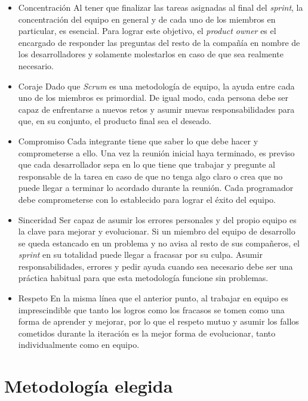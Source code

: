 \begin{itemize}

\item{Concentración} Al tener que finalizar las tareas asignadas al final del \textit{sprint}, la concentración del equipo en general y de cada uno de los miembros en particular, es esencial. Para lograr este objetivo, el \textit{product owner} es el encargado de responder las preguntas del resto de la compañía en nombre de los desarrolladores y solamente molestarlos en caso de que sea realmente necesario.

\item{Coraje} Dado que \textit{Scrum} es una metodología de equipo, la ayuda entre cada uno de los miembros es primordial. De igual modo, cada persona debe ser capaz de enfrentarse a nuevos retos y asumir nuevas responsabilidades para que, en su conjunto, el producto final sea el deseado. 

\item{Compromiso} Cada integrante tiene que saber lo que debe hacer y comprometerse a ello. Una vez la reunión inicial haya terminado, es previso que cada desarrollador sepa en lo que tiene que trabajar y pregunte al responsable de la tarea en caso de que no tenga algo claro o crea que no puede llegar a terminar lo acordado durante la reunión. Cada programador debe comprometerse con lo establecido para lograr el éxito del equipo.

\item{Sinceridad} Ser capaz de asumir los errores personales y del propio equipo es la clave para mejorar y evolucionar. Si un miembro del equipo de desarrollo se queda estancado en un problema y no avisa al resto de sus compañeros, el \textit{sprint} en su totalidad puede llegar a fracasar por su culpa. Asumir responsabilidades, errores y pedir ayuda cuando sea necesario debe ser una práctica habitual para que esta metodología funcione sin problemas.

\item{Respeto} En la misma línea que el anterior punto, al trabajar en equipo es imprescindible que tanto los logros como los fracasos se tomen como una forma de aprender y mejorar, por lo que el respeto mutuo y asumir los fallos cometidos durante la iteración es la mejor forma de evolucionar, tanto individualmente como en equipo.

\end{itemize}

\section{Metodología elegida}
\label{sec:metodologiaelegida}

